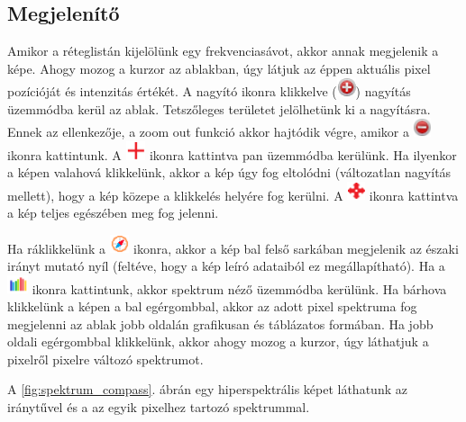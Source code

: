 \documentclass[a4paper,12pt]{article}
\begin{document}
\subsection{Megjelenítő}

Amikor a réteglistán kijelölünk egy frekvenciasávot, akkor annak megjelenik a képe. Ahogy mozog a kurzor az ablakban, úgy látjuk az éppen aktuális pixel pozícióját és intenzitás értékét. A nagyító ikonra klikkelve (\includegraphics[height=0.55cm]{magnifyikon}) nagyítás üzemmódba kerül az ablak. Tetszőleges területet jelölhetünk ki a nagyításra. Ennek az ellenkezője, a zoom out funkció akkor hajtódik végre, amikor a \includegraphics[height=0.55cm]{zoomoutikon} ikonra kattintunk. A \includegraphics[height=0.55cm]{panikon} ikonra kattintva pan üzemmódba kerülünk. Ha ilyenkor a képen valahová klikkelünk, akkor a kép úgy fog eltolódni (változatlan nagyítás mellett), hogy a kép közepe a klikkelés helyére fog kerülni. A \includegraphics[height=0.55cm]{zoomfullikon} ikonra kattintva a kép teljes egészében meg fog jelenni.

Ha ráklikkelünk a \includegraphics[height=0.55cm]{compassikon} ikonra, akkor a kép bal felső sarkában megjelenik az északi irányt mutató nyíl (feltéve, hogy a kép leíró adataiból ez megállapítható). Ha a \includegraphics[height=0.55cm]{spektrumikon} ikonra kattintunk, akkor spektrum néző üzemmódba kerülünk. Ha bárhova klikkelünk a képen a bal egérgombbal, akkor az adott pixel spektruma fog megjelenni az ablak jobb oldalán grafikusan és táblázatos formában. Ha jobb oldali egérgombbal klikkelünk, akkor ahogy mozog a kurzor, úgy láthatjuk a pixelről pixelre változó spektrumot.

A \ref{fig:spektrum_compass}. ábrán egy hiperspektrális képet láthatunk az iránytűvel és a az egyik pixelhez tartozó spektrummal.
\end{document}
